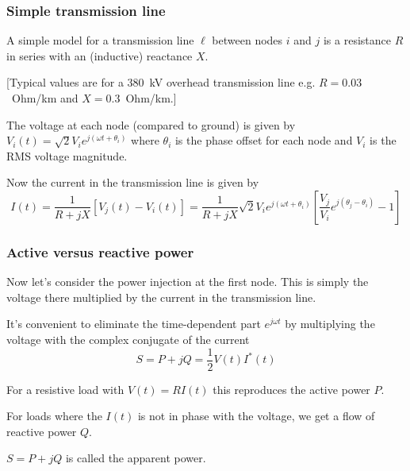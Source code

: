 \documentclass[10pt,aspectratio=169,dvipsnames]{beamer}
\begin{document}
\begin{frame}
  \frametitle{Simple transmission line}

  A simple model for a transmission line $\ell$ between nodes $i$ and
  $j$ is a resistance $R$ in series with an (inductive) reactance $X$.

  [Typical values are for a 380~kV overhead transmission line e.g. $R = 0.03$~Ohm/km and $X = 0.3$~Ohm/km.]

  The voltage at each node (compared to ground) is given by $V_i(t) = \sqrt{2}
  V_ie^{j(\omega t + \theta_i)}$ where $\theta_i$ is the phase offset
  for each node and $V_i$ is the RMS voltage magnitude.

  Now the current in the transmission line is given by
  \begin{equation*}
    I(t) = \frac{1}{R + jX} \left[ V_j(t) - V_i(t) \right] =  \frac{1}{R + jX}\sqrt{2} V_i e^{j(\omega t + \theta_i)} \left[\frac{V_j}{V_i} e^{j(\theta_j - \theta_i)} - 1\right]
  \end{equation*}



\end{frame}


\begin{frame}
  \frametitle{Active versus reactive power}

  Now let's consider the power injection at the first node. This is
  simply the voltage there multiplied by the current in the
  transmission line.

  It's convenient to eliminate the time-dependent part $e^{j\omega t}$
  by multiplying the voltage with the complex conjugate of the current
  \begin{equation*}
    S = P + jQ = \frac{1}{2} V(t)I^*(t)
  \end{equation*}

  For a resistive load with $V(t) = R I(t)$ this reproduces the
  \alert{active power} $P$.

  For loads where the $I(t)$ is not in phase with the voltage, we get
  a flow of \alert{reactive power} $Q$.

  $S = P + j Q$ is called the \alert{apparent power}.

\end{frame}
\end{document}
